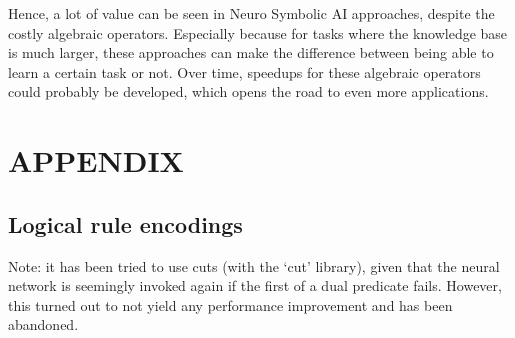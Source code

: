 \documentclass[english]{sobraep}
\begin{document}
Hence, a lot of value can be seen in Neuro Symbolic AI approaches, despite the costly algebraic operators. Especially because for tasks where the knowledge base is much larger, these approaches can make the difference between being able to learn a certain task or not. Over time, speedups for these algebraic operators could probably be developed, which opens the road to even more applications.


 

\section*{APPENDIX}
\subsection{Logical rule encodings}
Note: it has been tried to use cuts (with the `cut' library), given that the neural network is seemingly invoked again if the first of a dual predicate fails. However, this turned out to not yield any performance improvement and has been abandoned.
\label{appendix:logical_rule_encodings}
\inputminted[breaklines]{prolog}{"/home/jorrit/Data/KU Leuven/Semester 12/Capita Selecta H05N0a/deepproblog/src/deepproblog/examples/SORTOFCLEVR/model.pl"}

\end{document}
